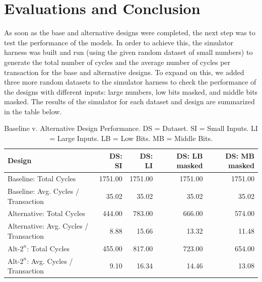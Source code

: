 \documentclass[10pt]{article}
\begin{document}
\section{Evaluations and Conclusion}

As soon as the base and alternative designs were completed, the next step was to test the performance of the models. In order to achieve this, the simulator harness was built and run (using the given random dataset of small numbers) to generate the total number of cycles and the average number of cycles per transaction for the base and alternative designs. To expand on this, we added three more random datasets to the simulator harness to check the performance of the designs with different inputs: large numbers, low bits masked, and middle bits masked. The results of the simulator for each dataset and design are summarized in the table below.

\begin{table}[h]
\begin{tabular} {|l | r  | r | r | r|}

\hline
\textbf{Design}    & \textbf{DS: SI} & \textbf{DS: LI} & \textbf{DS: LB masked} & \textbf{DS: MB masked} \\
\hline
Baseline:    Total Cycles                 & 1751.00                        & 1751.00                        & 1751.00                 & 1751.00 \\
Baseline:    Avg. Cycles / Transaction    & 35.02                          & 35.02                          & 35.02                   & 35.02   \\
Alternative: Total Cycles                 & 444.00                         & 783.00                         & 666.00                  & 574.00  \\
Alternative: Avg. Cycles / Transaction    & 8.88                           & 15.66                          & 13.32                   & 11.48   \\
Alt-$2^n$:	Total Cycles                  & 455.00				                 & 817.00                         & 723.00 					        & 654.00  \\
Alt-$2^n$:  Avg. Cycles / Transaction     & 9.10  	                       & 16.34                          & 14.46					          & 13.08   \\
\hline                    
\end{tabular}
\caption{Baseline v. Alternative Design Performance. DS = Dataset. SI = Small Inputs. LI = Large Inputs. LB = Low Bits. MB = Middle Bits.}
\end{table}
\end{document}
